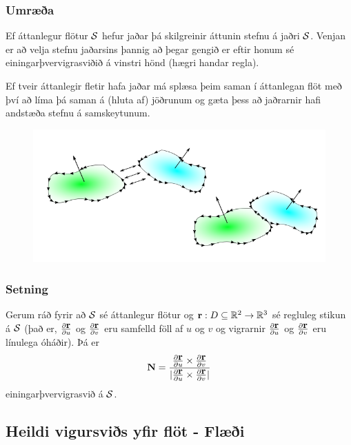  \subsubsection{Umræða \rtask{}}
  Ef áttanlegur flötur $\cal S$ hefur jaðar þá skilgreinir áttunin stefnu á jaðri $\cal S$. Venjan er að velja stefnu jaðarsins þannig að þegar gengið er eftir honum sé einingarþvervigrasviðið á vinstri hönd (hægri handar regla).
  
  \bigskip
  Ef tveir áttanlegir fletir hafa jaðar má splæsa þeim saman í áttanlegan flöt með því að líma þá saman á (hluta af) jöðrunum og gæta þess að jaðrarnir hafi andstæða stefnu á samskeytunum.
 

\begin {figure}[h!]
 \centering
            \includegraphics[width=0.95\linewidth]{joinsurf.png}
            \caption*{}
\end {figure}



\subsubsection{Setning }
 Gerum ráð fyrir að $\cal S$ sé áttanlegur
flötur og $\mbox{${\bf r}$}:D\subseteq{\mathbb R}^2\rightarrow {\mathbb R}^3$ sé regluleg stikun á
$\cal S$ (það er, $\frac{\partial \mbox{${\bf r}$}}{\partial u}$ og
$\frac{\partial \mbox{${\bf r}$}}{\partial v}$ eru samfelld föll af $u$ og $v$ og 
vigrarnir $\frac{\partial \mbox{${\bf r}$}}{\partial u}$ og
$\frac{\partial \mbox{${\bf r}$}}{\partial v}$ eru línulega óháðir).
Þá er 
$$\mbox{${\bf N}$}=
\frac{\frac{\partial \mbox{${\bf r}$}}{\partial u}\times\frac{\partial
    \mbox{${\bf r}$}}{\partial v}}
{|\frac{\partial \mbox{${\bf r}$}}{\partial u}\times\frac{\partial
    \mbox{${\bf r}$}}{\partial v}|}$$
einingarþvervigrasvið á $\cal S$.  




\subsection{Heildi vigursviðs yfir flöt - Flæði} 

